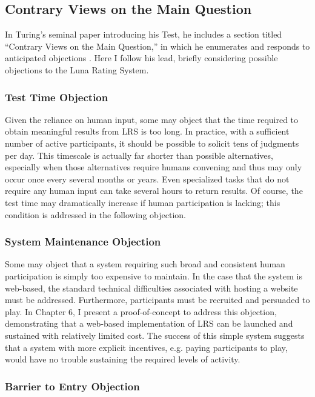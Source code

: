 \subsection{Contrary Views on the Main Question}

In Turing's seminal paper introducing his Test, he includes a section titled ``Contrary Views on the Main Question,'' in which he enumerates and responds to anticipated objections  \citep{turing1950computing}. Here I follow his lead, briefly considering possible objections to the Luna Rating System.

\subsubsection{Test Time Objection}

Given the reliance on human input, some may object that the time required to obtain meaningful results from LRS is too long. In practice, with a sufficient number of active participants, it should be possible to solicit tens of judgments per day. This timescale is actually far shorter than possible alternatives, especially when those alternatives require humans convening and thus may only occur once every several months or years. Even specialized tasks that do not require any human input can take several hours to return results. Of course, the test time may dramatically increase if human participation is lacking; this condition is addressed in the following objection.

\subsubsection{System Maintenance Objection}

Some may object that a system requiring such broad and consistent human participation is simply too expensive to maintain. In the case that the system is web-based, the standard technical difficulties associated with hosting a website must be addressed. Furthermore, participants must be recruited and persuaded to play. In Chapter $6$, I present a proof-of-concept to address this objection, demonstrating that a web-based implementation of LRS can be launched and sustained with relatively limited cost. The success of this simple system suggests that a system with more explicit incentives, e.g. paying participants to play, would have no trouble sustaining the required levels of activity.

\subsubsection{Barrier to Entry Objection}


